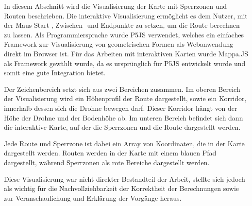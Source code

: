 In diesem Abschnitt wird die Visualisierung der Karte mit Sperrzonen und Routen beschrieben. Die interaktive Visualisierung ermöglicht es dem Nutzer, mit der Maus Start-, Zwischen- und Endpunkte zu setzen, um die Route berechnen zu lassen. Als Programmiersprache wurde P5JS verwendet, welches ein einfaches Framework zur Visualisierung von geometrischen Formen als Webanwendung direkt im Browser ist. Für das Arbeiten mit interaktiven Karten wurde Mappa.JS \cite{MappaJsCanvas} als Framework gewählt wurde, da es ursprünglich für P5JS \cite{HomeP5Js} entwickelt wurde und somit eine gute Integration bietet.

Der Zeichenbereich setzt sich aus zwei Bereichen zusammen.
Im oberen Bereich der Visualisierung wird ein Höhenprofil der Route dargestellt, sowie ein Korridor, innerhalb dessen sich die Drohne bewegen darf. Dieser Korridor hängt von der Höhe der Drohne und der Bodenhöhe ab.
Im unteren Bereich befindet sich dann die interaktive Karte, auf der die Sperrzonen und die Route dargestellt werden.

Jede Route und Sperrzone ist dabei ein Array von Koordinaten, die in der Karte dargestellt werden. Routen werden in der Karte mit einem blauen Pfad dargestellt, während Sperrzonen als rote Bereiche dargestellt werden.

Diese Visualisierung war nicht direkter Bestandteil der Arbeit,  stellte sich jedoch als wichtig für die Nachvollziehbarkeit der Korrektheit der Berechnungen sowie zur Veranschaulichung und Erklärung der Vorgänge heraus.